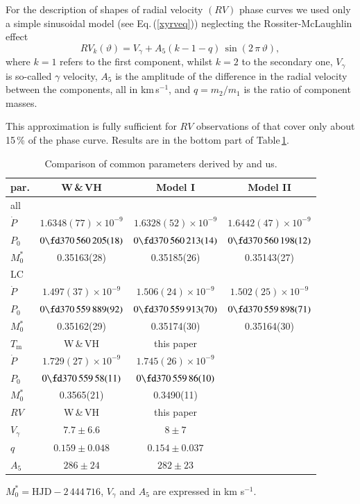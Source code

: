 \documentclass{aa}
\newcommand{\zav}[1]{\left(#1\right)}
\begin{document}
For the description of shapes of radial velocity $(RV)$ phase curves we used only a simple sinusoidal model (see Eq.\,(\ref{xyrveq})) neglecting the Rossiter-McLaughlin effect \citep{laugh}
\begin{equation}
RV_k(\vartheta)=V_{\gamma}+A_5 \zav{k-1-q}\,\sin(2\,\pi\,\vartheta),\label{xyrveq}
\end{equation}
where $k=1$ refers to the first component, whilst $k=2$ to the secondary one, $V_{\gamma}$ is so-called $\gamma$ velocity, $A_5$ is the amplitude of the difference in the radial velocity between the components, all in km\,s$^{-1}$, and $q=m_2/m_1$ is the ratio of component masses.

This approximation is fully sufficient for $RV$ observations of \citet{lean} that cover only about 15\,\% of the phase curve. Results are in the bottom part of Table\,\ref{xypar}.

\begin{table}\tiny
\begin{center}
\caption{\small Comparison of common parameters derived by \citet{wilson14} and us.}
\begin{tabular}{lccc}
\hline
  par. & W\,\&\,VH & Model I & Model II\\
   \hline
all\\
\hline
$\dot{P}$ &$1.6348(77) \times 10^{-9}$& $1.6328(52)\times 10^{-9}$& $1.6442(47)\times 10^{-9}$\\
$P_0$& $0\fd370\,560\,205(18)$& $0\fd370\,560\,213(14)$& $0\fd370\,560\,198(12)$\\
$M_0^*$  & 0.35163(28) & 0.35185(26) & 0.35143(27) \\
\hline
LC \\
\hline
$\dot{P}$ & $1.497(37) \times 10^{-9}$ & $1.506(24)\times 10^{-9}$& $1.502(25)\times 10^{-9}$ \\
$P_0$& $0\fd370\,559\,889(92)$& $0\fd370\,559\,913(70)$& $0\fd370\,559\,898(71)$\\
$M_0^*$  & 0.35162(29) & 0.35174(30) & 0.35164(30) \\
\hline
$T_{\mathrm m}$ & W\,\&\,VH & this paper \\
\hline
$\dot{P}$ & $1.729(27) \times 10^{-9}$ & $1.745(26)\times 10^{-9}$\\
$P_0$& $0\fd370\,559\,58(11)$& $0\fd370\,559\,86(10)$\\
$M_0^*$ & 0.3565(21) & 0.3490(11) \\
\hline
$RV$&W\,\&\,VH&this paper \\

\hline
$V_{\gamma}$ &$7.7\pm6.6$&$8\pm7$\\
$q$&$0.159\pm0.048$&$0.154\pm0.037$\\
$A_5$ &$286\pm24$& $282\pm23$\\
\hline
\end{tabular}\label{xypar}
\end{center}
$M_0^*= \mathrm{HJD}-2\,444\,716$, $V_{\gamma}$ and $A_5$ are expressed in km s$^{-1}$.
\end{table}
\end{document}
